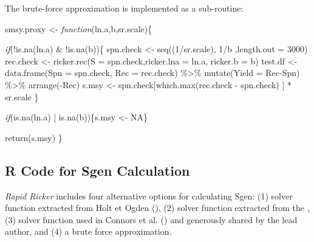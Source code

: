 \documentclass[french,11pt]{book}
\newenvironment{Shaded}{\begin{snugshade}}{\end{snugshade}}
\newcommand{\AttributeTok}[1]{\textcolor[rgb]{0.77,0.63,0.00}{#1}}
\newcommand{\ConstantTok}[1]{\textcolor[rgb]{0.00,0.00,0.00}{#1}}
\newcommand{\ControlFlowTok}[1]{\textcolor[rgb]{0.13,0.29,0.53}{\textit{#1}}}
\newcommand{\DecValTok}[1]{\textcolor[rgb]{0.00,0.00,0.81}{#1}}
\newcommand{\FunctionTok}[1]{\textcolor[rgb]{0.00,0.00,0.00}{#1}}
\newcommand{\NormalTok}[1]{#1}
\newcommand{\OtherTok}[1]{\textcolor[rgb]{0.56,0.35,0.01}{#1}}
\newcommand{\SpecialCharTok}[1]{\textcolor[rgb]{0.00,0.00,0.00}{#1}}
\begin{document}
The brute-force approximation is implemented as a sub-routine:
\begin{Shaded}
\begin{Highlighting}[]

\NormalTok{smsy.proxy }\OtherTok{\textless{}{-}} \ControlFlowTok{function}\NormalTok{(ln.a,b,sr.scale)\{}

\ControlFlowTok{if}\NormalTok{(}\SpecialCharTok{!}\FunctionTok{is.na}\NormalTok{(ln.a) }\SpecialCharTok{\&} \SpecialCharTok{!}\FunctionTok{is.na}\NormalTok{(b))\{}
\NormalTok{spn.check }\OtherTok{\textless{}{-}} \FunctionTok{seq}\NormalTok{((}\DecValTok{1}\SpecialCharTok{/}\NormalTok{sr.scale), }\DecValTok{1}\SpecialCharTok{/}\NormalTok{b ,}\AttributeTok{length.out =} \DecValTok{3000}\NormalTok{)  }
\NormalTok{rec.check }\OtherTok{\textless{}{-}}  \FunctionTok{ricker.rec}\NormalTok{(}\AttributeTok{S =}\NormalTok{ spn.check,}\AttributeTok{ricker.lna =}\NormalTok{ ln.a, }\AttributeTok{ricker.b =}\NormalTok{ b)}
\NormalTok{test.df }\OtherTok{\textless{}{-}} \FunctionTok{data.frame}\NormalTok{(}\AttributeTok{Spn =}\NormalTok{ spn.check, }\AttributeTok{Rec =}\NormalTok{ rec.check) }\SpecialCharTok{\%\textgreater{}\%} 
        \FunctionTok{mutate}\NormalTok{(}\AttributeTok{Yield =}\NormalTok{ Rec}\SpecialCharTok{{-}}\NormalTok{Spn) }\SpecialCharTok{\%\textgreater{}\%} \FunctionTok{arrange}\NormalTok{(}\SpecialCharTok{{-}}\NormalTok{Rec)}
\NormalTok{s.msy }\OtherTok{\textless{}{-}}\NormalTok{ spn.check[}\FunctionTok{which.max}\NormalTok{(rec.check }\SpecialCharTok{{-}}\NormalTok{ spn.check) ]  }\SpecialCharTok{*}\NormalTok{ sr.scale}
\NormalTok{\}}

\ControlFlowTok{if}\NormalTok{(}\FunctionTok{is.na}\NormalTok{(ln.a) }\SpecialCharTok{|} \FunctionTok{is.na}\NormalTok{(b))\{s.msy }\OtherTok{\textless{}{-}} \ConstantTok{NA}\NormalTok{\}}

\FunctionTok{return}\NormalTok{(s.msy)}
\NormalTok{\}}
\end{Highlighting}
\end{Shaded}
\subsection{R Code for Sgen Calculation}\label{BMFunsSgen}

\emph{Rapid Ricker} includes four alternative options for calculating Sgen: (1) solver function extracted from Holt et Ogden (), (2) solver function extracted from the , (3) solver function used in Connors et al. () and generously shared by the lead author, and (4) a brute force approximation.
\end{document}
